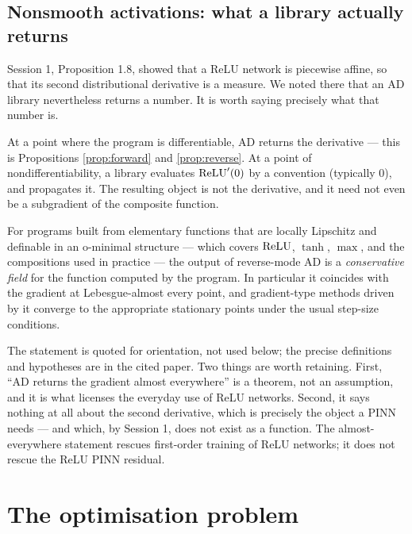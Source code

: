 \documentclass[11pt,a4paper]{article}
\begin{document}
\subsection{Nonsmooth activations: what a library actually returns}

Session 1, Proposition 1.8, showed that a ReLU network is piecewise affine, so that its second
distributional derivative is a measure. We noted there that an AD library nevertheless returns a
number. It is worth saying precisely what that number is.

At a point where the program is differentiable, AD returns the derivative --- this is
Propositions \ref{prop:forward} and \ref{prop:reverse}. At a point of nondifferentiability, a
library evaluates $\operatorname{ReLU}'(0)$ by a convention (typically $0$), and propagates it. The resulting
object is not the derivative, and it need not even be a subgradient of the composite function.

\begin{theorem}\label{th:bolte}
For programs built from elementary functions that are locally Lipschitz and definable in an
o-minimal structure --- which covers $\operatorname{ReLU}$, $\tanh$, $\max$, and the compositions used in
practice --- the output of reverse-mode AD is a \emph{conservative field} for the function computed
by the program. In particular it coincides with the gradient at Lebesgue-almost every point, and
gradient-type methods driven by it converge to the appropriate stationary points under the usual
step-size conditions.
\end{theorem}

\begin{remark}
The statement is quoted for orientation, not used below; the precise definitions and hypotheses are
in the cited paper. Two things are worth retaining. First, ``AD returns the gradient almost
everywhere'' is a theorem, not an assumption, and it is what licenses the everyday use of ReLU
networks. Second, it says nothing at all about the second derivative, which is precisely the object
a PINN needs --- and which, by Session 1, does not exist as a function. The almost-everywhere
statement rescues first-order training of ReLU networks; it does not rescue the ReLU PINN residual.
\end{remark}

\section{The optimisation problem}
\end{document}
